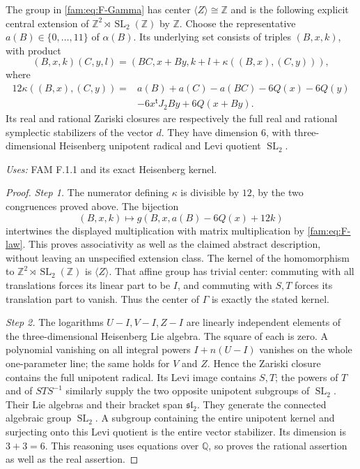 \begin{proposition}[FAM F.1.2; T]\label{fam:F.1.2}
The group in \eqref{fam:eq:F-Gamma} has center
$\langle Z\rangle\cong\mathbb Z$ and is the following explicit central
extension of $\mathbb Z^2\rtimes\operatorname{SL}_2(\mathbb Z)$ by
$\mathbb Z$.  Choose the representative $a(B)\in\{0,\ldots,11\}$ of
$\alpha(B)$.  Its underlying set consists of triples $(B,x,k)$, with
product
\[
 (B,x,k)(C,y,l)=(BC,x+By,k+l+\kappa((B,x),(C,y))),
\]
where
\begin{align*}
12\kappa((B,x),(C,y))={}&a(B)+a(C)-a(BC)-6Q(x)-6Q(y)\\
 &-6x^{\mathsf t}J_2By+6Q(x+By).
\end{align*}
Its real and rational Zariski closures are respectively the full real
and rational symplectic stabilizers of the vector $d$.  They have
dimension $6$, with three-dimensional Heisenberg unipotent radical and
Levi quotient $\operatorname{SL}_2$.
\end{proposition}
\noindent\emph{Uses:} FAM F.1.1 and its exact Heisenberg kernel.\par

\begin{proof}
\par\noindent\textit{Step 1.} The numerator defining $\kappa$ is divisible by $12$, by the two
congruences proved above.  The bijection
\[
 (B,x,k)\longmapsto g(B,x,a(B)-6Q(x)+12k)
\]
intertwines the displayed multiplication with matrix multiplication by
\eqref{fam:eq:F-law}.  This proves associativity as well as the claimed abstract
description, without leaving an unspecified extension class.  The kernel
of the homomorphism to $\mathbb Z^2\rtimes\operatorname{SL}_2(\mathbb Z)$
is $\langle Z\rangle$.  That affine group has trivial center: commuting
with all translations forces its linear part to be $I$, and commuting
with $S,T$ forces its translation part to vanish.  Thus the center of
$\Gamma$ is exactly the stated kernel.

\par\noindent\textit{Step 2.} The logarithms $U-I,V-I,Z-I$ are linearly independent elements of the
three-dimensional Heisenberg Lie algebra.  The square of each is zero.
A polynomial vanishing on all integral powers $I+n(U-I)$ vanishes on
the whole one-parameter line; the same holds for $V$ and $Z$.  Hence the
Zariski closure contains the full unipotent radical.  Its Levi image
contains $S,T$; the powers of $T$ and of $STS^{-1}$ similarly supply the
two opposite unipotent subgroups of $\operatorname{SL}_2$.  Their Lie
algebras and their bracket span $\mathfrak{sl}_2$.  They generate the
connected algebraic group $\operatorname{SL}_2$.  A subgroup containing
the entire unipotent kernel and surjecting onto this Levi quotient is
the entire vector stabilizer.  Its dimension is $3+3=6$.  This reasoning
uses equations over $\mathbb Q$, so proves the rational assertion as
well as the real assertion.
\end{proof}

